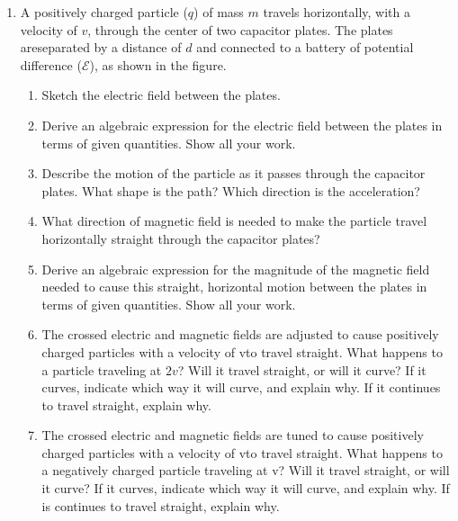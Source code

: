 \documentclass{../../../oss-classkick}
\begin{document}
\vspace{.3in}
\begin{center}
\end{center}
\begin{enumerate}[leftmargin=15pt]

\item A positively charged particle ($q$) of mass $m$ travels horizontally,
  with a velocity of $v$, through the center of two capacitor plates. The
  plates areseparated by a distance of $d$ and connected to a battery of
  potential difference ($\mathcal{E}$), as shown in the figure.
  \begin{enumerate}
  \item Sketch the electric field between the plates.
  \item Derive an algebraic expression for the electric field between the
    plates in terms of given quantities. Show all your work.
  \item Describe the motion of the particle as it passes through the capacitor
    plates. What shape is the path? Which direction is the acceleration?
  \item What direction of magnetic field is needed to make the particle travel
    horizontally straight through the capacitor plates?
  \item Derive an algebraic expression for the magnitude of the magnetic field
    needed to cause this straight, horizontal motion between the plates in
    terms of given quantities. Show all your work.
  \item The crossed electric and magnetic fields are adjusted to cause
    positively charged particles with a velocity of vto travel straight. What
    happens to a particle traveling at $2v$? Will it travel straight, or will it
    curve? If it curves, indicate which way it will curve, and explain why.
    If it continues to travel straight, explain why.
  \item The crossed electric and magnetic fields are tuned to cause positively
    charged particles with a velocity of vto travel straight. What happens
    to a negatively charged particle traveling at v? Will it travel straight, or
    will it curve? If it curves, indicate which way it will curve, and explain
    why. If is continues to travel straight, explain why.
  \end{enumerate}
  \newpage
  

\end{enumerate}
\end{document}
